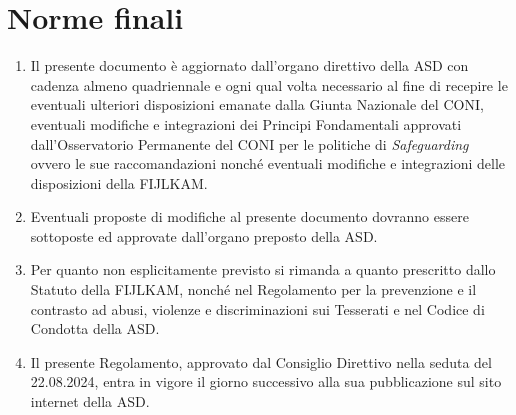 \documentclass{djtsasddoc}
\begin{document}
	\section{Norme finali}
	\begin{enumerate}
		\item Il presente documento è aggiornato dall'organo direttivo della ASD con cadenza almeno quadriennale e ogni qual volta necessario al fine di recepire le eventuali ulteriori disposizioni emanate dalla Giunta Nazionale del CONI, eventuali modifiche e integrazioni dei Principi Fondamentali approvati dall'Osservatorio Permanente del CONI per le politiche di \textit{Safeguarding} ovvero le sue raccomandazioni nonché eventuali modifiche e integrazioni delle disposizioni della FIJLKAM.
		\item Eventuali proposte di modifiche al presente documento dovranno essere sottoposte ed approvate dall'organo preposto della ASD.
		\item Per quanto non esplicitamente previsto si rimanda a quanto prescritto dallo Statuto della FIJLKAM, nonché nel Regolamento per la prevenzione e il contrasto ad abusi, violenze e discriminazioni sui Tesserati e nel Codice di Condotta della ASD.
		\item Il presente Regolamento, approvato dal Consiglio Direttivo nella seduta del 22.08.2024, entra in vigore il giorno successivo alla sua pubblicazione sul sito internet della ASD.
	\end{enumerate}
	
\end{document}
